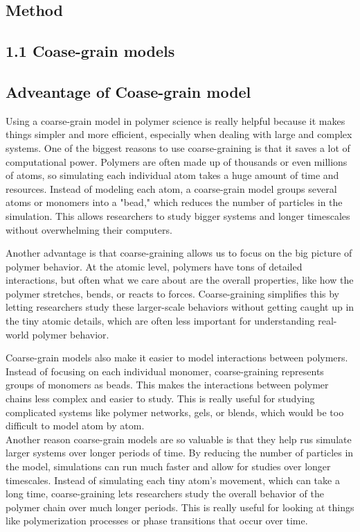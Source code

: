 \documentclass[12pt]{article}
\begin{document}
\begin{flushleft}
\vspace{-1em}
\section*{Method} 
\vspace{-1em}
\subsection*{1.1 Coase-grain models}
\vspace{-1em} 
\subsection*{Adveantage of Coase-grain model}



	Using a coarse-grain model in polymer science is really helpful because it makes things simpler and more efficient, especially when dealing with large and complex systems. One of the biggest reasons to use coarse-graining is that it saves a lot of computational power. Polymers are often made up of thousands or even millions of atoms, so simulating each individual atom takes a huge amount of time and resources. Instead of modeling each atom, a coarse-grain model groups several atoms or monomers into a "bead," which reduces the number of particles in the simulation. This allows researchers to study bigger systems and longer timescales without overwhelming their computers.

	Another advantage is that coarse-graining allows us to focus on the big picture of polymer behavior. At the atomic level, polymers have tons of detailed interactions, but often what we care about are the overall properties, like how the polymer stretches, bends, or reacts to forces. Coarse-graining simplifies this by letting researchers study these larger-scale behaviors without getting caught up in the tiny atomic details, which are often less important for understanding real-world polymer behavior.
	
	Coarse-grain models also make it easier to model interactions between polymers. Instead of focusing on each individual monomer, coarse-graining represents groups of monomers as beads. This makes the interactions between polymer chains less complex and easier to study. This is really useful for studying complicated systems like polymer networks, gels, or blends, which would be too difficult to model atom by atom.\\
	
	
	Another reason coarse-grain models are so valuable is that they help rus simulate larger systems over longer periods of time. By reducing the number of particles in the model, simulations can run much faster and allow for studies over longer timescales. Instead of simulating each tiny atom’s movement, which can take a long time, coarse-graining lets researchers study the overall behavior of the polymer chain over much longer periods. This is really useful for looking at things like polymerization processes or phase transitions that occur over time.
	

\end{flushleft}
\end{document}
